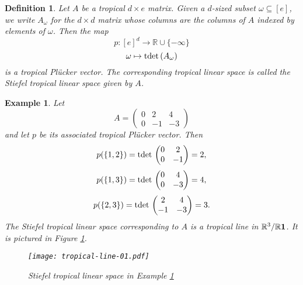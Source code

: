 \documentclass[12pt]{extarticle}
\numberwithin{theorem}{section}
\newtheorem{definition}[theorem]{Definition}
\newtheorem{example}[theorem]{Example}
\newcommand{\RR}{\mathbb{R}}
\newcommand{\tdet}{\text{tdet\,}}
\begin{document}
\begin{comment}
\begin{definition}
Let $p$ be a valuated matroid, and let $\sigma$ be a $(d-1)$-sized subset of $[e]$. We define $p(\sigma*)$ to be the vector in $\overline \RR^e$ whose $k$th coordinate is $p(\sigma\cup\{k\})$. We call $p(\sigma*)$ a \emph{cocircuit} of the valuated matroid $p$ unless $p(\sigma*)=(-\infty,\ldots,-\infty)$. We often identify $\pi(\sigma*)$ as an element of $\mathbb T\mathbb P^{e-1}$.
\end{definition}
\end{comment}

\begin{definition}
\label{stiefel-tropical-linear-space}
Let $A$ be a tropical $d\times e$ matrix. Given a $d$-sized subset $\omega\subseteq [e]$, we write $A_\omega$ for the $d\times d$ matrix whose columns are the columns of $A$ indexed by elements of $\omega$. Then the map
\[p:[e]^d\to\mathbb R\cup \{-\infty\}\]
\[ \omega\mapsto \tdet(A_\omega)\]
is a tropical Pl\"ucker vector. The corresponding tropical linear space is called the \emph{Stiefel tropical linear space} given by $A$.
\end{definition}

\begin{example}
\label{tropical-linear-space-example}
Let
\[A = \left(\begin{matrix}0 & 2 & 4\\
0 & -1 & -3\end{matrix}\right)\]
and let $p$ be its associated tropical Pl\"ucker vector. Then 
\[p(\{1,2\})=\tdet\left(\begin{matrix}0&2\\0&-1\end{matrix}\right)=2,\]
\[p(\{1,3\})=\tdet\left(\begin{matrix}0&4\\0&-3\end{matrix}\right)=4,\]
\[p(\{2,3\})=\tdet\left(\begin{matrix}2&4\\-1&-3\end{matrix}\right)=3.\]
The Stiefel tropical linear space corresponding to $A$ is a tropical line in $\RR^3/\RR {\bf 1}$. It is pictured in Figure \ref{pic_example3_4}.
\begin{figure}[!ht]
\centering
\texttt{[image: tropical-line-01.pdf]}
\caption{Stiefel tropical linear space in Example \ref{tropical-linear-space-example}}
\label{pic_example3_4}
\end{figure}
\end{example}
\end{document}
